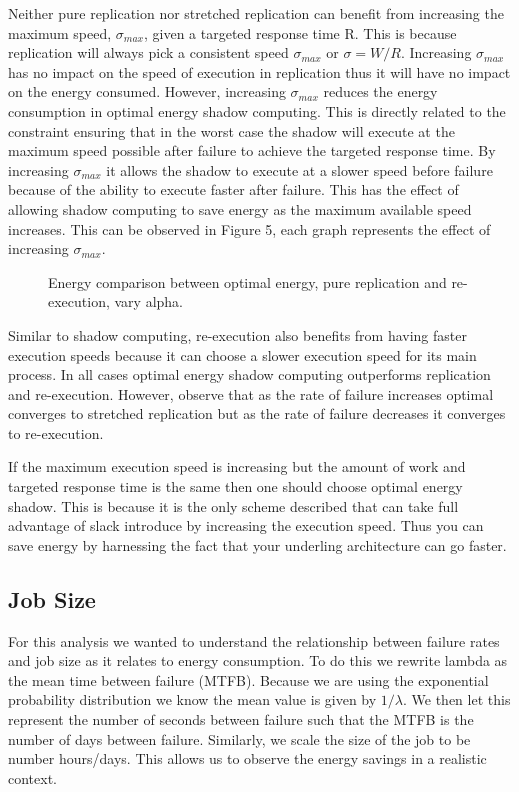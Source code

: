 Neither pure replication nor stretched replication can benefit from
increasing the maximum speed, $\sigma_{max}$, given a targeted
response time R. This is because replication will always pick a
consistent speed $\sigma_{max}$ or $\sigma=W/R$. Increasing
$\sigma_{max}$ has no impact on the speed of execution in replication
thus it will have no impact on the energy consumed. However,
increasing $\sigma_{max}$ reduces the energy consumption in optimal
energy shadow computing. This is directly related to the constraint
ensuring that in the worst case the shadow will execute at the maximum
speed possible after failure to achieve the targeted response time. By
increasing $\sigma_{max}$ it allows the shadow to execute at a slower
speed before failure because of the ability to execute faster after
failure. This has the effect of allowing shadow computing to save
energy as the maximum available speed increases. This can be observed
in Figure 5, each graph represents the effect of increasing
$\sigma_{max}$.

\begin{figure*}[hHtb]
\centering
{}
\caption { Energy comparison between optimal energy, pure replication and re-execution, vary alpha.}
\label{energy_savings_opt_replication_rexecution_grid}
\end{figure*}

Similar to shadow computing, re-execution also benefits from having
faster execution speeds because it can choose a slower execution speed
for its main process. In all cases optimal energy shadow computing
outperforms replication and re-execution. However, observe that as the
rate of failure increases optimal converges to stretched replication
but as the rate of failure decreases it converges to re-execution.

If the maximum execution speed is increasing but the amount of work
and targeted response time is the same then one should choose optimal
energy shadow. This is because it is the only scheme described that
can take full advantage of slack introduce by increasing the execution
speed. Thus you can save energy by harnessing the fact that your
underling architecture can go faster.


\subsection{Job Size}

For this analysis we wanted to understand the relationship between
failure rates and job size as it relates to energy consumption. To do
this we rewrite lambda as the mean time between failure
(MTFB). Because we are using the exponential probability distribution
we know the mean value is given by $1/\lambda$. We then let this
represent the number of seconds between failure such that the MTFB is
the number of days between failure. Similarly, we scale the size of
the job to be number hours/days. This allows us to observe the energy
savings in a realistic context.

